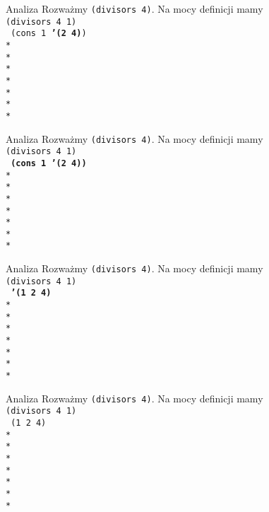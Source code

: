 \begin{frame}{Analiza}
  Rozważmy \texttt{(divisors 4)}. Na mocy definicji mamy\\
  \texttt{(divisors 4 1)}\\
  \texttt{
    (cons 1 \textbf{'(2 4)})\\*
    \ \\*
    \ \\*
    \ \\*
    \ \\*
    \ \\*
    \ \\*
  }
\end{frame}

\begin{frame}{Analiza}
  Rozważmy \texttt{(divisors 4)}. Na mocy definicji mamy\\
  \texttt{(divisors 4 1)}\\
  \texttt{
    \textbf{(cons 1 '(2 4))}\\*
    \ \\*
    \ \\*
    \ \\*
    \ \\*
    \ \\*
    \ \\*
  }
\end{frame}

\begin{frame}{Analiza}
  Rozważmy \texttt{(divisors 4)}. Na mocy definicji mamy\\
  \texttt{(divisors 4 1)}\\
  \texttt{
    \textbf{'(1 2 4)}\\*
    \ \\*
    \ \\*
    \ \\*
    \ \\*
    \ \\*
    \ \\*
  }
\end{frame}

\begin{frame}{Analiza}
  Rozważmy \texttt{(divisors 4)}. Na mocy definicji mamy\\
  \texttt{(divisors 4 1)}\\
  \texttt{
    (1 2 4)\\*
    \ \\*
    \ \\*
    \ \\*
    \ \\*
    \ \\*
    \ \\*
  }
\end{frame}
